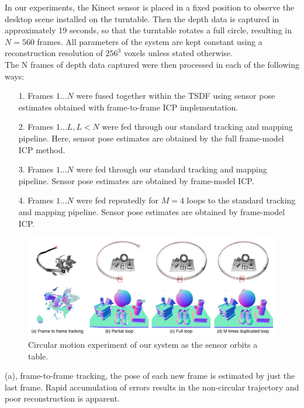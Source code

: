 \documentclass[a4paper,12pt]{article}
\begin{document}
In our experiments, the Kinect sensor is placed in a fixed position to observe the desktop scene installed on the turntable. 
Then the depth data is captured in approximately 19 seconds, so that the turntable rotates a full circle, resulting in $N = 560$ frames. 
All parameters of the system are kept constant using a reconstruction resolution of $256^3$ voxels unless stated otherwise.
\\The N frames of depth data captured were then processed in each of the following ways:
\begin{itemize}
	\item[1.] Frames $1...N$ were fused together within the TSDF using sensor pose estimates obtained with frame-to-frame ICP implementation.
	\item[2.] Frames $1...L, L < N$ were fed through our standard tracking and mapping pipeline. Here, sensor pose estimates are obtained by the full frame-model ICP method.
	\item[3.] Frames $1...N$ were fed through our standard tracking and mapping pipeline. Sensor pose estimates are obtained by frame-model ICP.
	\item[4.] Frames $1...N$ were fed repeatedly for $M = 4$ loops to the standard tracking and mapping pipeline. Sensor pose estimates are obtained by frame-model ICP.
\end{itemize}
\begin{figure}[h] %
    \centering %
    \includegraphics[scale=0.45]{figure6.png} %
    \caption{Circular motion experiment of our system as the sensor orbits a table\cite{6162880}.} %
    \label{figure6} %
\end{figure}%
(a), frame-to-frame tracking, the pose of each new frame is estimated by just the last frame. Rapid accumulation of errors results in the non-circular trajectory and poor reconstruction is apparent.
\end{document}
